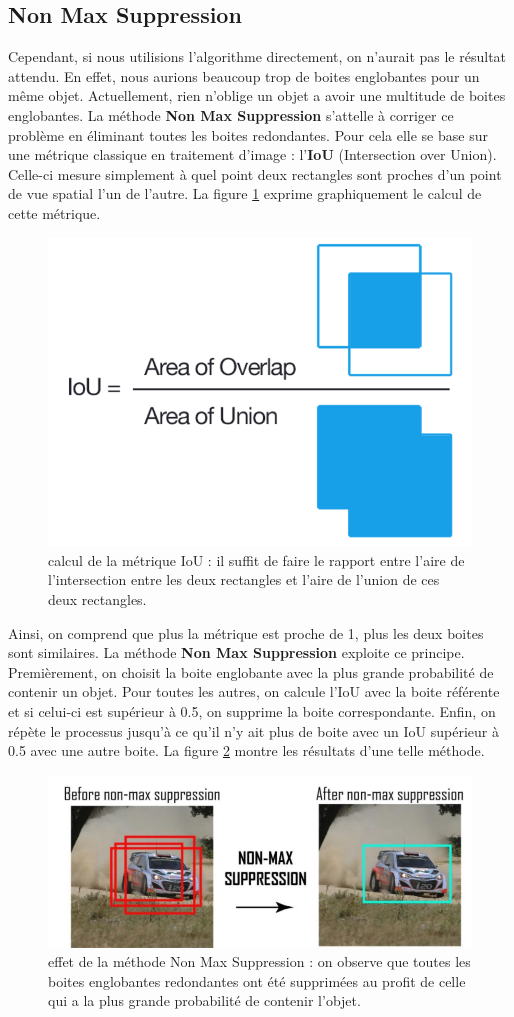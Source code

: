 \subsection{Non Max Suppression}

Cependant, si nous utilisions l'algorithme directement, on n'aurait pas le résultat attendu. En effet, nous aurions beaucoup trop de boites englobantes pour un même objet. Actuellement, rien n'oblige un objet a avoir une multitude de boites englobantes. La méthode \textbf{Non Max Suppression} s'attelle à corriger ce problème en éliminant toutes les boites redondantes. Pour cela elle se base sur une métrique classique en traitement d'image : l'\textbf{IoU} (Intersection over Union). Celle-ci mesure simplement à quel point deux rectangles sont proches d'un point de vue spatial l'un de l'autre. La figure \ref{IoU} exprime graphiquement le calcul de cette métrique.

\begin{figure}[!h]
\centering
\includegraphics[width=100pts]{images/Mask_R_CNN/IoU.png} 
\caption{calcul de la métrique IoU : il suffit de faire le rapport entre l'aire de l'intersection entre les deux rectangles et l'aire de l'union de ces deux rectangles.}
\label{IoU}
\end{figure}

Ainsi, on comprend que plus la métrique est proche de 1, plus les deux boites sont similaires. La méthode \textbf{Non Max Suppression} exploite ce principe. Premièrement, on choisit la boite englobante avec la plus grande probabilité de contenir un objet. Pour toutes les autres, on calcule l'IoU avec la boite référente et si celui-ci est supérieur à 0.5, on supprime la boite correspondante. Enfin, on répète le processus jusqu'à ce qu'il n'y ait plus de boite avec un IoU supérieur à 0.5 avec une autre boite. La figure \ref{non_max_suppression} montre les résultats d'une telle méthode.

\begin{figure}[!h]
\centering
\includegraphics[width=200pts]{images/Mask_R_CNN/non_max_suppression.png} 
\caption{effet de la méthode Non Max Suppression : on observe que toutes les boites englobantes redondantes ont été supprimées au profit de celle qui a la plus grande probabilité de contenir l'objet.}
\label{non_max_suppression}
\end{figure}

